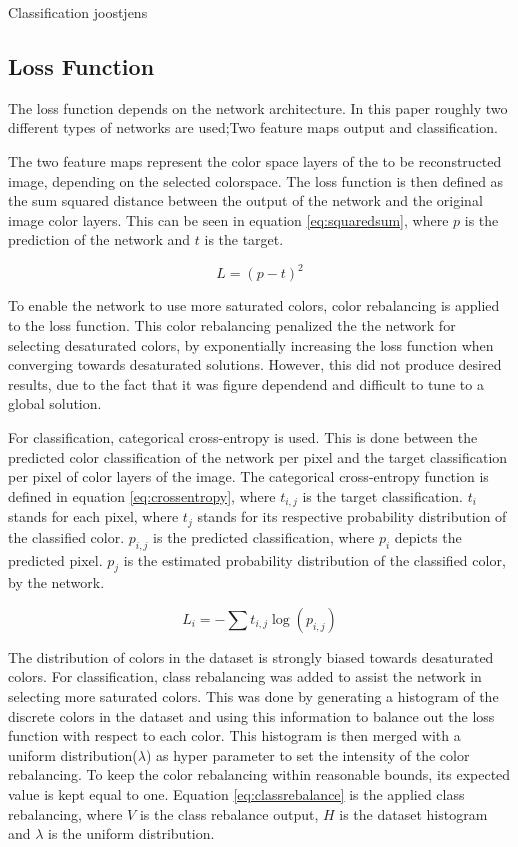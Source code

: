 {\color{red} Classification joostjens}

\subsection{Loss Function}
The loss function depends on the network architecture. In this paper roughly two different types of networks are used;Two feature maps output and classification. 

The two feature maps represent the color space layers of the to be reconstructed image, depending on the selected colorspace. The loss function is then defined as the sum squared distance between the output of the network and the original image color layers. This can be seen in equation \ref{eq:squaredsum}, where $p$ is the prediction of the network and $t$ is the target. 

\begin{equation}
\label{eq:squaredsum}
L = (p - t)^2
\end{equation}

To enable the network to use more saturated colors, color rebalancing is applied to the loss function. This color rebalancing penalized the the network for selecting desaturated colors, by exponentially increasing the loss function when converging towards desaturated solutions. However, this did not produce desired results, due to the fact that it was figure dependend and difficult to tune to a global solution. 

For classification, categorical cross-entropy is used. This is done between the predicted color classification of the network per pixel and the target classification per pixel of color layers of the image. The categorical cross-entropy function is defined in equation \ref{eq:crossentropy}, where $t_{i,j}$ is the target classification. $t_i$ stands for each pixel, where $t_j$ stands for its respective probability distribution of the classified color. 
$p_{i,j}$ is the predicted classification, where $p_{i}$ depicts the predicted pixel. $p_{j}$ is the estimated probability distribution of the classified color, by the network.  

\begin{equation}
\label{eq:crossentropy}
L_{i} = -\sum t_{i,j}\log(p_{i,j})
\end{equation}

The distribution of colors in the dataset is strongly biased towards desaturated colors. For classification, class rebalancing was added to assist the network in selecting more saturated colors. This was done by generating a histogram of the discrete colors in the dataset and using this information to balance out the loss function with respect to each color. This histogram is then merged with a uniform distribution($\lambda$) as hyper parameter to set the intensity of the color rebalancing. To keep the color rebalancing within reasonable bounds, its expected value is kept equal to one. Equation \ref{eq:classrebalance} is the applied class rebalancing, where $V$ is the class rebalance output, $H$ is the dataset histogram and $\lambda$ is the uniform distribution. 

